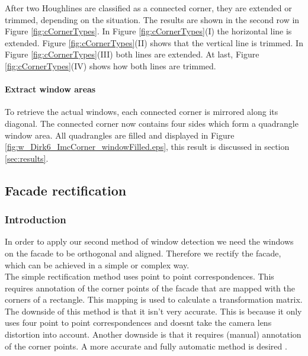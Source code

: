 After two Houghlines are classified as a connected corner, they are extended or
trimmed, depending on the situation. The results are shown in the second row in
Figure \ref{fig:cCornerTypes}.
In Figure \ref{fig:cCornerTypes}(I)  the horizontal line is extended.  Figure
\ref{fig:cCornerTypes}(II) shows that the vertical line is trimmed.  In Figure
\ref{fig:cCornerTypes}(III) both lines are extended.  At last, Figure
\ref{fig:cCornerTypes}(IV) shows how both lines are trimmed.


\paragraph{Extract window areas}
To retrieve the actual windows, each connected corner is mirrored along its
diagonal. The connected corner now contains four sides which form a 
quadrangle window area.
All quadrangles are filled and displayed in Figure
\ref{fig:w_Dirk6_ImcCorner_windowFilled.eps}, this result is discussed in section
\ref{sec:results}.










\subsection{Facade rectification}
\subsubsection{Introduction}
In order to apply our second method of window detection
we need the windows on the facade to be orthogonal and aligned.
Therefore we rectify the facade, which can be achieved in a simple or complex way.\\

The simple rectification method uses point to point correspondences. This 
requires annotation of the corner points of the facade that are mapped with the
corners of a rectangle. This mapping is used to calculate a transformation matrix. 
 The downside of this method is that it isn't very accurate.
This is because it only uses four point to point correspondences 
 and doesnt take the camera lens distortion into account.
 Another downside is that it requires (manual) annotation of the corner points.
A more accurate and fully automatic method is desired .\\

